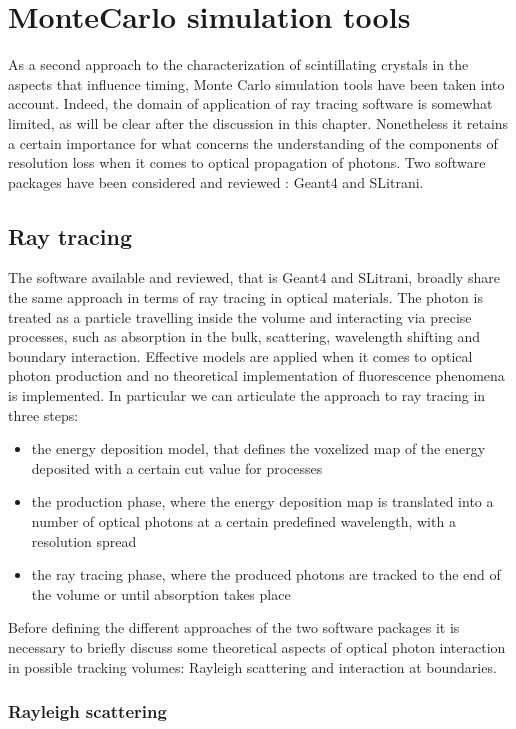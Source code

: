 
\chapter{MonteCarlo simulation tools}

As a second approach to the characterization of scintillating crystals in the aspects that influence timing, Monte Carlo simulation tools have been taken into account. Indeed, the domain of application of ray tracing software is somewhat limited, as will be clear after the discussion in this chapter. Nonetheless it retains a certain importance for what concerns the understanding of the components of resolution loss when it comes to optical propagation of photons. Two software packages have been considered and reviewed \cite{Pizzi2012}: Geant4 and SLitrani.

\section{Ray tracing}

The software available and reviewed, that is Geant4 and SLitrani, broadly share the same approach in terms of ray tracing in optical materials. 
The photon is treated as a particle travelling inside the volume and interacting via precise processes, such as absorption in the bulk, scattering, wavelength shifting and boundary interaction. 
Effective models are applied when it comes to optical photon production and no theoretical implementation of fluorescence phenomena is implemented. In particular we can articulate the approach to ray tracing in three steps:
\begin{itemize}
\item the energy deposition model, that defines the voxelized map of the energy deposited with a certain cut value for processes
\item the production phase, where the energy deposition map is translated into a number of optical photons at a certain predefined wavelength, with a resolution spread
\item the ray tracing phase, where the produced photons are tracked to the end of the volume or until absorption takes place
\end{itemize}
Before defining the different approaches of the two software packages it is necessary to briefly discuss some theoretical aspects of optical photon interaction in possible tracking volumes: Rayleigh scattering and interaction at boundaries.

\subsection{Rayleigh scattering}


